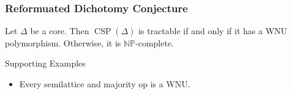 \documentclass[12pt,xcolor=dvipsnames,handout
   ]{beamer}
\DeclareMathOperator{\CSP}{CSP}
\renewcommand{\.}{\cdot}
\newcommand{\NP}{\ensuremath{\mathbb{NP}}\xspace}
\begin{document}
\begin{frame}
  \frametitle{Reformuated Dichotomy Conjecture}

  Let $\Delta$ be a core. Then $\CSP(\Delta)$ is tractable if and only
  if it has a WNU polymorphism. Otherwise, it is \NP-complete. 

  \bigskip
  \begin{overprint}
     
     
     
    \begin{exampleblock}{Supporting Examples}
      \begin{itemize}
      \item Every semilattice and majority op is a WNU.
        

\end{itemize}
\end{exampleblock}
\end{overprint}
\end{frame}
\end{document}
